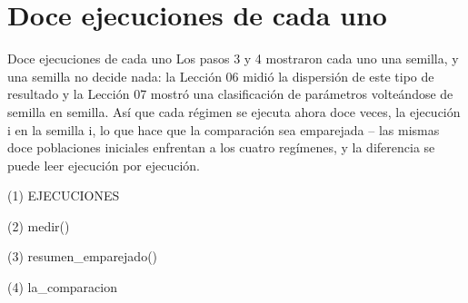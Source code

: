 
\section{Doce ejecuciones de cada uno}

\begin{frame}{Doce ejecuciones de cada uno}
Los pasos 3 y 4 mostraron cada uno una semilla, y una semilla no decide nada: la Lección 06
midió la dispersión de este tipo de resultado y la Lección 07 mostró una clasificación de
parámetros volteándose de semilla en semilla. Así que cada régimen se ejecuta ahora doce veces,
la ejecución i en la semilla i, lo que hace que la comparación sea emparejada -- las mismas doce poblaciones
iniciales enfrentan a los cuatro regímenes, y la diferencia se puede leer ejecución por ejecución.
\end{frame}

\begin{frame}[fragile]{(1) EJECUCIONES}

\end{frame}

\begin{frame}[fragile]{(2) medir()}

\end{frame}

\begin{frame}[fragile]{(3) resumen\_emparejado()}

\end{frame}

\begin{frame}[fragile]{(4) la\_comparacion}

\end{frame}

